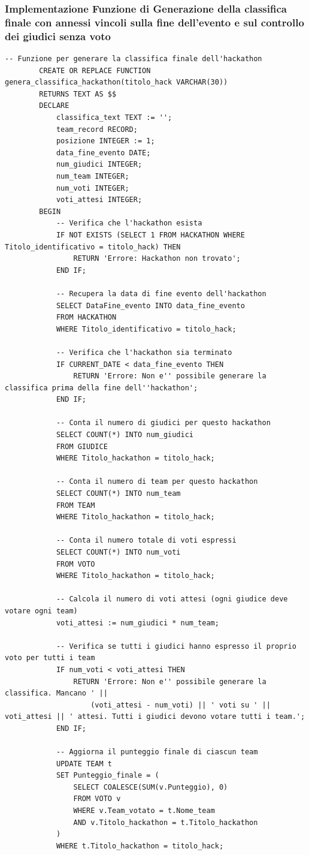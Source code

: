 \documentclass[a4paper, 10pt]{article}
\begin{document}
	\subsubsection{Implementazione Funzione di Generazione della classifica finale con annessi vincoli sulla fine dell'evento e sul controllo dei giudici senza voto}
	\begin{lstlisting}[style=sqlstyle]
		-- Funzione per generare la classifica finale dell'hackathon
		CREATE OR REPLACE FUNCTION genera_classifica_hackathon(titolo_hack VARCHAR(30))
		RETURNS TEXT AS $$
		DECLARE
			classifica_text TEXT := '';
			team_record RECORD;
			posizione INTEGER := 1;
			data_fine_evento DATE;
			num_giudici INTEGER;
			num_team INTEGER;
			num_voti INTEGER;
			voti_attesi INTEGER;
		BEGIN
			-- Verifica che l'hackathon esista
			IF NOT EXISTS (SELECT 1 FROM HACKATHON WHERE Titolo_identificativo = titolo_hack) THEN
				RETURN 'Errore: Hackathon non trovato';
			END IF;
			
			-- Recupera la data di fine evento dell'hackathon
			SELECT DataFine_evento INTO data_fine_evento
			FROM HACKATHON
			WHERE Titolo_identificativo = titolo_hack;
			
			-- Verifica che l'hackathon sia terminato
			IF CURRENT_DATE < data_fine_evento THEN
				RETURN 'Errore: Non e'' possibile generare la classifica prima della fine dell''hackathon';
			END IF;
			
			-- Conta il numero di giudici per questo hackathon
			SELECT COUNT(*) INTO num_giudici
			FROM GIUDICE
			WHERE Titolo_hackathon = titolo_hack;
			
			-- Conta il numero di team per questo hackathon
			SELECT COUNT(*) INTO num_team
			FROM TEAM
			WHERE Titolo_hackathon = titolo_hack;
			
			-- Conta il numero totale di voti espressi
			SELECT COUNT(*) INTO num_voti
			FROM VOTO
			WHERE Titolo_hackathon = titolo_hack;
			
			-- Calcola il numero di voti attesi (ogni giudice deve votare ogni team)
			voti_attesi := num_giudici * num_team;
			
			-- Verifica se tutti i giudici hanno espresso il proprio voto per tutti i team
			IF num_voti < voti_attesi THEN
				RETURN 'Errore: Non e'' possibile generare la classifica. Mancano ' || 
					(voti_attesi - num_voti) || ' voti su ' || voti_attesi || ' attesi. Tutti i giudici devono votare tutti i team.';
			END IF;
			
			-- Aggiorna il punteggio finale di ciascun team
			UPDATE TEAM t
			SET Punteggio_finale = (
				SELECT COALESCE(SUM(v.Punteggio), 0)
				FROM VOTO v
				WHERE v.Team_votato = t.Nome_team
				AND v.Titolo_hackathon = t.Titolo_hackathon
			)
			WHERE t.Titolo_hackathon = titolo_hack;
			

\end{lstlisting}
\end{document}
